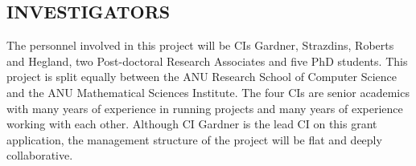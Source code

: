 \iffalse
\subsection*{ROLE OF PERSONNEL}
\fi
\subsection*{INVESTIGATORS}


%


The personnel involved in this project will be CIs Gardner, Strazdins,
Roberts and Hegland, two Post-doctoral Research Associates and five
PhD students. This project is split equally between the ANU Research
School of Computer Science and the ANU Mathematical Sciences
Institute. The four CIs are senior academics with many years of
experience in running projects and many years of experience working
with each other. Although CI Gardner is the lead CI on this grant
application, the management structure of the project will be flat and
deeply collaborative.


